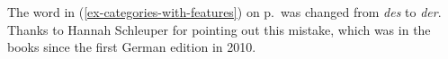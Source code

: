 

%


%
%


The word in (\ref{ex-categories-with-features}) on p.\,\pageref{ex-categories-with-features} was
changed from \emph{des} to \emph{der}. Thanks to Hannah Schleuper for
pointing out this mistake, which was in the books since the first German edition in 2010. 

